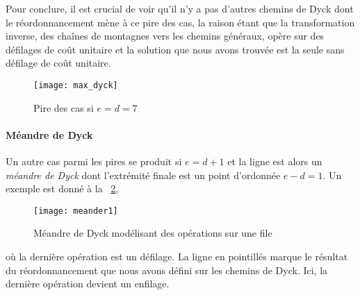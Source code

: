 Pour conclure, il est crucial de voir qu'il n'y a pas d'autres chemins
de Dyck dont le réordonnancement mène à ce pire des cas, la raison
étant que la transformation inverse, des chaînes de montagnes vers les
chemins généraux, opère sur des défilages de coût unitaire et la
solution que nous avons trouvée est la seule sans défilage de coût
unitaire.
\begin{figure}
\centering
\texttt{[image: max\_dyck]}
\caption{Pire des cas si \(e=d=7\)}
\label{fig:max_dyck}
\end{figure}

\paragraph{Méandre de Dyck}

Un autre cas parmi les pires se produit si \(e = d + 1\) et la ligne
est alors un \emph{méandre de Dyck} dont l'extrémité finale est un
point d'ordonnée \(e-d=1\). Un exemple est donné à la
\fig~\ref{fig:meander1},
\begin{figure}[b]
\centering
\texttt{[image: meander1]}
\caption{Méandre de Dyck modélisant des opérations sur une file}
\label{fig:meander1}
\end{figure}
où la dernière opération est un défilage. La ligne en pointillés
marque le résultat du réordonnancement que nous avons défini sur les
chemins de Dyck. Ici, la dernière opération devient un enfilage.

